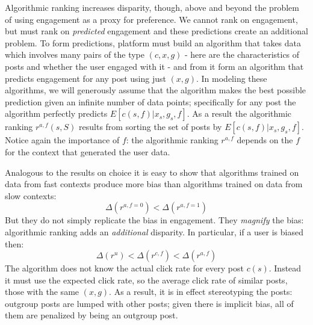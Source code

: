 \documentclass[12pt,letterpaper]{article}
\begin{document}
Algorithmic ranking increases disparity, though, above and beyond the problem of using engagement as a proxy for preference. We cannot rank on engagement, but must rank on \textit{predicted} engagement and these predictions create an additional problem. To form predictions, platform must build an algorithm that takes data which involves many pairs of the type $(c,x,g)$ - here are the characteristics of posts and whether the user engaged with it - and from it form an algorithm that predicts engagement for any post using just $(x,g)$. In modeling these algorithms, we will generously assume that the algorithm makes the best possible prediction given an infinite number of data points; specifically for any post the algorithm perfectly predicts $E[c(s,f)|x_s,g_s,f]$.   As a result the algorithmic ranking $r^{a,f}(s,S)$ results from sorting the set of posts by $E[c(s,f) \vert x_s,g_s,f]$. Notice again the importance of $f$: the algorithmic ranking $r^{a,f}$ depends on the $f$ for the context that generated the user data. 

Analogous to the results on choice it is easy to show that algorithms trained on data from fast contexts produce more bias than algorithms trained on data from slow contexts:  $$\Delta(r^{a,f=0}) < \Delta(r^{a,f=1})$$
But they do not simply replicate the bias in engagement. They \textit{magnify} the bias: algorithmic ranking adds an \textit{additional} disparity. In particular, if a user is biased then: 
$$\Delta(r^u) < \Delta(r^{c,f}) < \Delta(r^{a,f})$$ 
The algorithm does not know the actual click rate for every post $c(s)$. Instead it must use the expected click rate, so the average click rate of similar posts, those with the same $(x,g)$. As a result, it is in effect stereotyping the posts: outgroup posts are lumped with other posts; given there is implicit bias, all of them are penalized by being an outgroup post.
\end{document}
